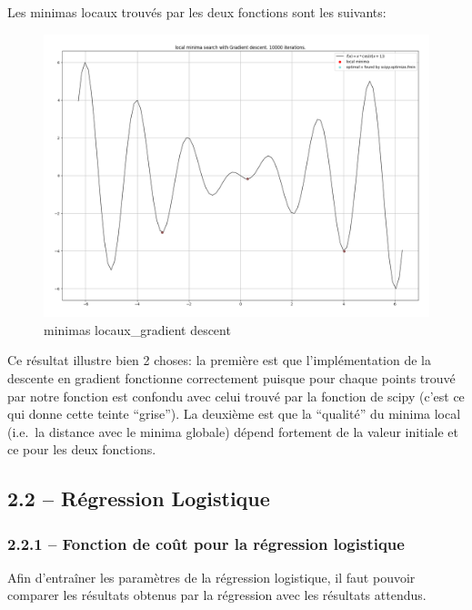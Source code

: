\documentclass[
]{article}
\begin{document}
Les minimas locaux trouvés par les deux fonctions sont les suivants:

\begin{figure}
\centering
\includegraphics[width=1\textwidth,height=\textheight]{../res/3.1_gradient_descent_minima.png}
\caption{minimas locaux\_gradient descent}
\end{figure}

Ce résultat illustre bien 2 choses: la première est que l'implémentation
de la descente en gradient fonctionne correctement puisque pour chaque
points trouvé par notre fonction est confondu avec celui trouvé par la
fonction de scipy (c'est ce qui donne cette teinte ``grise''). La
deuxième est que la ``qualité'' du minima local (i.e.~la distance avec
le minima globale) dépend fortement de la valeur initiale et ce pour les
deux fonctions.

\newpage{}

\subsection{2.2 -- Régression
Logistique}\label{ruxe9gression-logistique-1}

\subsubsection{2.2.1 -- Fonction de coût pour la régression
logistique}\label{fonction-de-couxfbt-pour-la-ruxe9gression-logistique}

Afin d'entraîner les paramètres de la régression logistique, il faut
pouvoir comparer les résultats obtenus par la régression avec les
résultats attendus.
\end{document}

